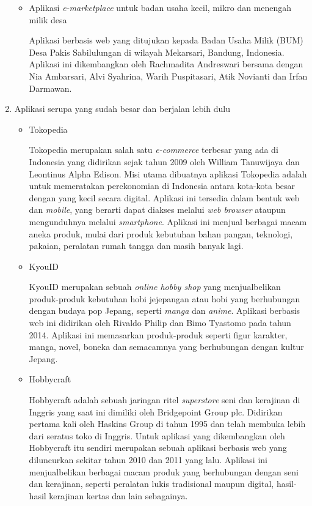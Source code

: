 \documentclass[a4paper]{article}
\begin{document}
\begin{enumerate}
\begin{itemize}
        \item Aplikasi \textit{e-marketplace} untuk badan usaha kecil, mikro dan menengah milik desa
        
        Aplikasi berbasis web yang ditujukan kepada Badan Usaha Milik (BUM) Desa Pakis Sabilulungan di wilayah Mekarsari, Bandung, Indonesia. Aplikasi ini dikembangkan oleh Rachmadita Andreswari bersama dengan Nia Ambarsari, Alvi Syahrina, Warih Puspitasari, Atik Novianti dan Irfan Darmawan\autocite{bum-mekarsari}.
    
    \end{itemize}

    \item Aplikasi serupa yang sudah besar dan berjalan lebih dulu
    
    \begin{itemize}
        \item Tokopedia
        
        Tokopedia merupakan salah satu \textit{e-commerce} terbesar yang ada di Indonesia yang didirikan sejak tahun 2009 oleh William Tanuwijaya dan Leontinus Alpha Edison. Misi utama dibuatnya aplikasi Tokopedia adalah untuk memeratakan perekonomian di Indonesia antara kota-kota besar dengan yang kecil secara digital. Aplikasi ini tersedia dalam bentuk web dan \textit{mobile}, yang berarti dapat diakses melalui \textit{web browser} ataupun mengunduhnya melalui \textit{smartphone}\autocite{about-tokped}. Aplikasi ini menjual berbagai macam aneka produk, mulai dari produk kebutuhan bahan pangan, teknologi, pakaian, peralatan rumah tangga dan masih banyak lagi.

        \item KyouID
        
        KyouID merupakan sebuah \textit{online hobby shop} yang menjualbelikan produk-produk kebutuhan hobi jejepangan atau hobi yang berhubungan dengan budaya pop Jepang, seperti \textit{manga} dan \textit{anime}. Aplikasi berbasis web ini didirikan oleh Rivaldo Philip dan Bimo Tyastomo pada tahun 2014\autocite{pendiri-kyouid}. Aplikasi ini memasarkan produk-produk seperti figur karakter, manga, novel, boneka dan semacamnya yang berhubungan dengan kultur Jepang\autocite{web-kyouid}.

        \item Hobbycraft
        
        Hobbycraft adalah sebuah jaringan ritel \textit{superstore} seni dan kerajinan di Inggris yang saat ini dimiliki oleh Bridgepoint Group plc. Didirikan pertama kali oleh Haskins Group di tahun 1995 dan telah membuka lebih dari seratus toko di Inggris. Untuk aplikasi yang dikembangkan oleh Hobbycraft itu sendiri merupakan sebuah aplikasi berbasis web yang diluncurkan sekitar tahun 2010 dan 2011 yang lalu\autocite{about-hobbycraft}. Aplikasi ini menjualbelikan berbagai macam produk yang berhubungan dengan seni dan kerajinan, seperti peralatan lukis tradisional maupun digital, hasil-hasil kerajinan kertas dan lain sebagainya.

    \end{itemize}

\end{enumerate}
\end{document}
